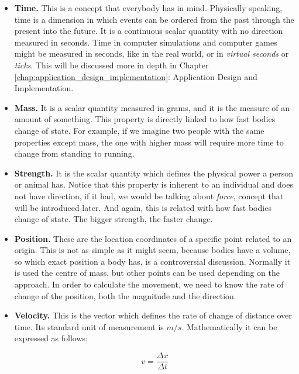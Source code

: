 \begin{itemize}

\item{{\bf Time.} This is a concept that everybody has in mind. Physically speaking, time is a dimension in which events can be ordered from the past through the present into the future. It is a continuous scalar quantity with no direction measured in seconds. Time in computer simulations and computer games might be measured in seconds, like in the real world, or in \emph{virtual seconds} or \emph{ticks}. This will be discussed more in depth in Chapter \ref{chap:application_design_implementation}: Application Design and Implementation.}

\item{{\bf Mass.} It is a scalar quantity measured in grams, and it is the measure of an amount of something. This property is directly linked to how fast bodies change of state. For example, if we imagine two people with the same properties except mass, the one with higher mass will require more time to change from standing to running.}

\item{{\bf Strength.} It is the scalar quantity which defines the physical power a person or animal has. Notice that this property is inherent to an individual and does not have direction, if it had, we would be talking about \emph{force}, concept that will be introduced later. And again, this is related with how fast bodies change of state. The bigger strength, the faster change.}

\item{{\bf Position.} These are the location coordinates of a specific point related to an origin. This is not as simple as it might seem, because bodies have a volume, so which exact position a body has, is a controversial discussion. Normally it is used the centre of mass, but other points can be used depending on the approach. In order to calculate the movement, we need to know the rate of change of the position, both the magnitude and the direction.}

\item{{\bf Velocity.} This is the vector which defines the rate of change of distance over time. Its standard unit of measurement is $m/s$. Mathematically it can be expressed as follows:}

\begin{equation}
  v=\frac{\Delta x}{\Delta t}
\end{equation}


\end{itemize}
